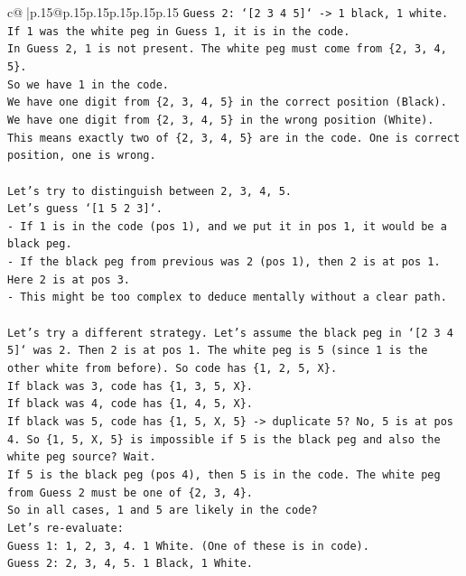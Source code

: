 \documentclass{article}
\begin{document}
{\begin{supertabular}{c@{$\;$}|p{.15\linewidth}@{}p{.15\linewidth}p{.15\linewidth}p{.15\linewidth}p{.15\linewidth}p{.15\linewidth}}
{{{\texttt{Guess 2: `{[}2 3 4 5{]}` {-}> 1 black, 1 white.} \\
\texttt{If 1 was the white peg in Guess 1, it is in the code.} \\
\texttt{In Guess 2, 1 is not present. The white peg must come from \{2, 3, 4, 5\}.} \\
\texttt{So we have 1 in the code.} \\
\texttt{We have one digit from \{2, 3, 4, 5\} in the correct position (Black).} \\
\texttt{We have one digit from \{2, 3, 4, 5\} in the wrong position (White).} \\
\texttt{This means exactly two of \{2, 3, 4, 5\} are in the code. One is correct position, one is wrong.} \\
\\ 
\texttt{Let's try to distinguish between 2, 3, 4, 5.} \\
\texttt{Let's guess `{[}1 5 2 3{]}`.} \\
\texttt{{-} If 1 is in the code (pos 1), and we put it in pos 1, it would be a black peg.} \\
\texttt{{-} If the black peg from previous was 2 (pos 1), then 2 is at pos 1. Here 2 is at pos 3.} \\
\texttt{{-} This might be too complex to deduce mentally without a clear path.} \\
\\ 
\texttt{Let's try a different strategy. Let's assume the black peg in `{[}2 3 4 5{]}` was 2. Then 2 is at pos 1. The white peg is 5 (since 1 is the other white from before). So code has \{1, 2, 5, X\}.} \\
\texttt{If black was 3, code has \{1, 3, 5, X\}.} \\
\texttt{If black was 4, code has \{1, 4, 5, X\}.} \\
\texttt{If black was 5, code has \{1, 5, X, 5\} {-}> duplicate 5? No, 5 is at pos 4. So \{1, 5, X, 5\} is impossible if 5 is the black peg and also the white peg source? Wait.} \\
\texttt{If 5 is the black peg (pos 4), then 5 is in the code. The white peg from Guess 2 must be one of \{2, 3, 4\}.} \\
\texttt{So in all cases, 1 and 5 are likely in the code?} \\
\texttt{Let's re{-}evaluate:} \\
\texttt{Guess 1: 1, 2, 3, 4. 1 White. (One of these is in code).} \\
\texttt{Guess 2: 2, 3, 4, 5. 1 Black, 1 White.} \\
}}}
\end{supertabular}}
\end{document}
